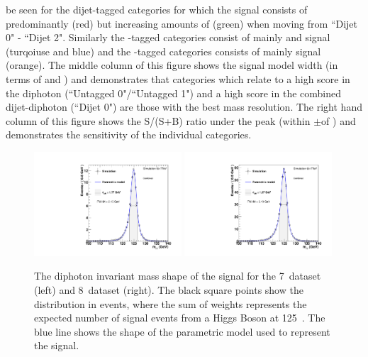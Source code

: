 be seen for the dijet-tagged categories for which the signal consists of predominantly \VBF (red) but increasing amounts of \ggH (green) when moving from ``Dijet 0" - ``Dijet 2". Similarly the \VH-tagged categories consist of mainly \WH and \ZH signal (turqoiuse and blue) and the \ttH-tagged categories consists of mainly \ttH signal (orange). The middle column of this figure shows the signal model width (in terms of \sigeff and \sigFW) and demonstrates that categories which relate to a high score in the diphoton \BDT (``Untagged 0"/``Untagged 1") and a high score in the combined dijet-diphoton \BDT (``Dijet 0") are those with the best mass resolution. The right hand column of this figure shows the S/(S+B) ratio under the peak (within $\pm$\sigeff of \mH) and demonstrates the sensitivity of the individual categories.

\begin{figure}
  \begin{center}
    \includegraphics[width=0.49\textwidth]{analysis/plots/ThesisFits/mva_7TeV/all.pdf}
    \includegraphics[width=0.49\textwidth]{analysis/plots/ThesisFits/mva_8TeV/all.pdf}
    \caption[The diphoton invariant mass shape for \SM Higgs signal]{The diphoton invariant mass shape of the \SM signal for the 7~\TeV dataset (left) and 8~\TeV dataset (right). The black square points show the distribution in \MC events, where the sum of weights represents the expected number of signal events from a \SM Higgs Boson at 125~\GeV. The blue line shows the shape of the parametric model used to represent the signal.}
    \label{fig:sig_shape}
  \end{center}
\end{figure}

